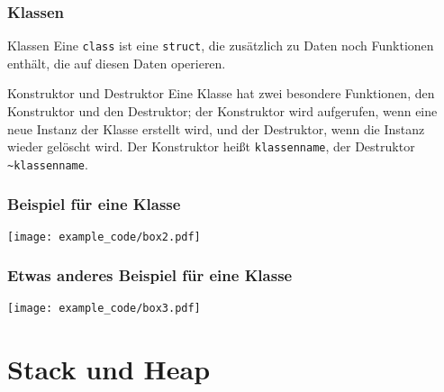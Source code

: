 \documentclass[18pt]{beamer}
\begin{document}
\begin{frame}
    \frametitle{Klassen}
    \begin{block}{Klassen}
    Eine \texttt{class} ist eine \texttt{struct}, die zusätzlich zu Daten noch Funktionen enthält, die auf diesen Daten operieren.
    \end{block}
    \begin{block}{Konstruktor und Destruktor}
    Eine Klasse hat zwei besondere Funktionen, den Konstruktor und den Destruktor; der Konstruktor wird aufgerufen, wenn eine neue Instanz der Klasse erstellt wird, und der Destruktor, wenn die Instanz wieder gelöscht wird. Der Konstruktor heißt \texttt{klassenname}, der Destruktor \texttt{\~{}klassenname}.
    \end{block}
\end{frame}
\begin{frame}
    \frametitle{Beispiel für eine Klasse}
    \vspace{0.7cm}
    \texttt{[image: example\_code/box2.pdf]}
\end{frame}
\begin{frame}
    \frametitle{Etwas anderes Beispiel für eine Klasse}
    \texttt{[image: example\_code/box3.pdf]}
\end{frame}





\section{Stack und Heap}


\end{document}
